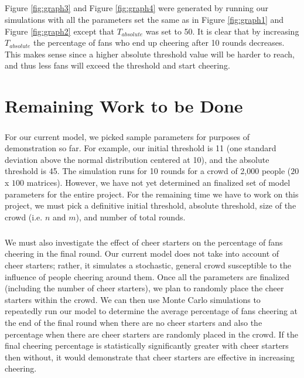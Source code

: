 \documentclass[oneside,12pt]{report}
\def\prefacesection#1{
\chapter*{#1}
\addcontentsline{toc}{chapter}{#1}
}
\begin{document}
\paragraph{}
Figure \ref{fig:graph3} and Figure \ref{fig:graph4} were generated by running our simulations with all the parameters set the same as in Figure \ref{fig:graph1} and Figure \ref{fig:graph2} except that $T_{absolute}$ was set to 50. It is clear that by increasing $T_{absolute}$ the percentage of fans who end up cheering after 10 rounds decreases. This makes sense since a higher absolute threshold value will be harder to reach, and thus less fans will exceed the threshold and start cheering. 

\prefacesection{Remaining Work to be Done}
\paragraph{}
For our current model, we picked sample parameters for purposes of demonstration so far. For example, our initial threshold is 11 (one standard deviation above the normal distribution centered at 10), and the absolute threshold is 45. The simulation runs for 10 rounds for a crowd of 2,000 people ($20$ x $100$ matrices). However, we have not yet determined an finalized set of model parameters for the entire project. For the remaining time we have to work on this project, we must pick a definitive initial threshold, absolute threshold, size of the crowd (i.e. $n$ and $m$), and number of total rounds.
\paragraph{}
We must also investigate the effect of cheer starters on the percentage of fans cheering in the final round. Our current model does not take into account of cheer starters; rather, it simulates a stochastic, general crowd susceptible to the influence of people cheering around them. Once all the parameters are finalized (including the number of cheer starters), we plan to randomly place the cheer starters within the crowd. We can then use Monte Carlo simulations to repeatedly run our model to determine the average percentage of fans cheering at the end of the final round when there are no cheer starters and also the percentage when there are cheer starters are randomly placed in the crowd. If the final cheering percentage is statistically significantly greater with cheer starters then without, it would demonstrate that cheer starters are effective in increasing cheering. 
 
\end{document}
